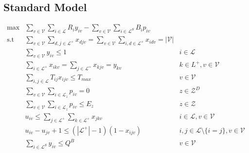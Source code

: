 \subsection{Standard Model}
\renewcommand{\theequation}{A.\arabic{equation}}
\setcounter{equation}{0}
\begin{eqnarray}
        \max & \displaystyle\sum_{v\in \mathcal{V}} \displaystyle\sum_{i \in \mathcal{L}} R_{i}y_{iv} - \displaystyle\sum_{v\in \mathcal{V}} \displaystyle\sum_{i \in \mathcal{L}^{S}} B_{i}p_{iv} & \label{eq:objective}\\
        \text{s.t} & \displaystyle\sum_{v\in \mathcal{V}} \displaystyle\sum_{d,j\in \mathcal{L}^+}x_{djv} = \displaystyle\sum_{v\in \mathcal{V}} \displaystyle\sum_{i,d\in \mathcal{L}^+}x_{idv} = |\mathcal{V}|  \label{eq:const_deopt}\\ 
	    & \displaystyle\sum_{v\in \mathcal{V}}y_{iv} \leq 1 & i \in \mathcal{L} \label{eq:const_at_most_once}\\
	    & \displaystyle\sum_{i\in \mathcal{L}^{+}}x_{ikv} = \displaystyle\sum_{j\in \mathcal{L}^{+}}x_{kjv} = y_{kv} & k \in L^{+}, v\in \mathcal{V} \label{eq:const_connectivity}\\
	    & \displaystyle\sum_{i,j \in \mathcal{L}} T_{ij}x_{ijv} \leq T_{max} & v\in \mathcal{V} \label{eq:const_time}\\
	    & \displaystyle\sum_{v\in \mathcal{V}}\displaystyle\sum_{i\in \mathcal{L}_z} p_{iv} = 0  & z\in \mathcal{Z}^D \label{eq:pickup_zone}\\
    	& \displaystyle\sum_{v\in \mathcal{V}}\displaystyle\sum_{i\in \mathcal{L}_z} p_{iv} \leq E_z & z\in \mathcal{Z} \label{eq:pickup_zone_2}\\
	    & u_{iv} \leq \displaystyle\sum_{j \in \mathcal{L}^{+}} \displaystyle\sum_{k \in \mathcal{L}^{+}} x_{jkv} &  i\in \mathcal{L}, v\in \mathcal{V} \label{eq:const_subtour1}\\
	    & u_{iv} - u_{jv} +1 \leq (|\mathcal{L}^{+}|-1)(1-x_{ijv})&   i,j \in \mathcal{L} \setminus\{i=j\}, v\in \mathcal{V} \label{eq:const_subtour2}\\
   	    & \displaystyle\sum_{i\in \mathcal{L}^{S}}y_{iv} \leq Q^{B} &   v \in \mathcal{V} \label{eq:capacity_const}\\

\end{eqnarray}
